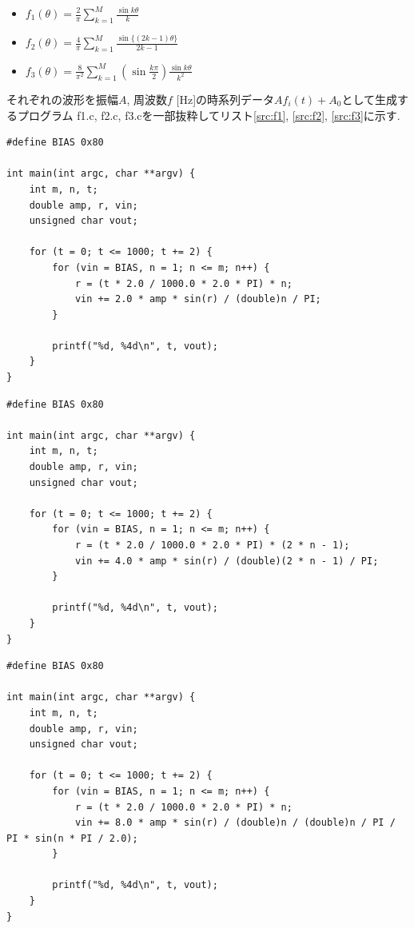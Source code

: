 \documentclass[titlepage]{jsarticle}
\begin{document}
    \begin{itemize}
        \item $\displaystyle f_1(\theta) = \frac{2}{\pi} \sum^M_{k = 1}\frac{\sin{k \theta}}{k}$
        \item $\displaystyle f_2(\theta) = \frac{4}{\pi} \sum^M_{k = 1}\frac{\sin{\{(2k - 1) \theta}\}}{2k - 1}$
        \item $\displaystyle f_3(\theta) = \frac{8}{\pi^2} \sum^M_{k = 1} \left(\sin{\frac{k\pi}{2}}\right) \frac{\sin{k\theta}}{k^2}$
    \end{itemize}

    それぞれの波形を振幅$A$, 周波数$f$ [Hz]の時系列データ$Af_i(t) + A_0$として生成するプログラム
    f1.c, f2.c, f3.cを一部抜粋してリスト\ref{src:f1}, \ref{src:f2}, \ref{src:f3}に示す.

    \begin{lstlisting}[caption=f1.c, label=src:f1]
#define BIAS 0x80
        
int main(int argc, char **argv) {
    int m, n, t;
    double amp, r, vin;
    unsigned char vout;

    for (t = 0; t <= 1000; t += 2) {
        for (vin = BIAS, n = 1; n <= m; n++) {
            r = (t * 2.0 / 1000.0 * 2.0 * PI) * n;
            vin += 2.0 * amp * sin(r) / (double)n / PI;
        }

        printf("%d, %4d\n", t, vout);
    }
}\end{lstlisting}

    \begin{lstlisting}[caption=f2.c, label=src:f2]
#define BIAS 0x80

int main(int argc, char **argv) {
    int m, n, t;
    double amp, r, vin;
    unsigned char vout;

    for (t = 0; t <= 1000; t += 2) {
        for (vin = BIAS, n = 1; n <= m; n++) {
            r = (t * 2.0 / 1000.0 * 2.0 * PI) * (2 * n - 1);
            vin += 4.0 * amp * sin(r) / (double)(2 * n - 1) / PI;
        }

        printf("%d, %4d\n", t, vout);
    }
}\end{lstlisting}

    \begin{lstlisting}[caption=f3.c, label=src:f3]
#define BIAS 0x80

int main(int argc, char **argv) {
    int m, n, t;
    double amp, r, vin;
    unsigned char vout;

    for (t = 0; t <= 1000; t += 2) {
        for (vin = BIAS, n = 1; n <= m; n++) {
            r = (t * 2.0 / 1000.0 * 2.0 * PI) * n;
            vin += 8.0 * amp * sin(r) / (double)n / (double)n / PI / PI * sin(n * PI / 2.0);
        }
        
        printf("%d, %4d\n", t, vout);
    }
}\end{lstlisting}
\end{document}
